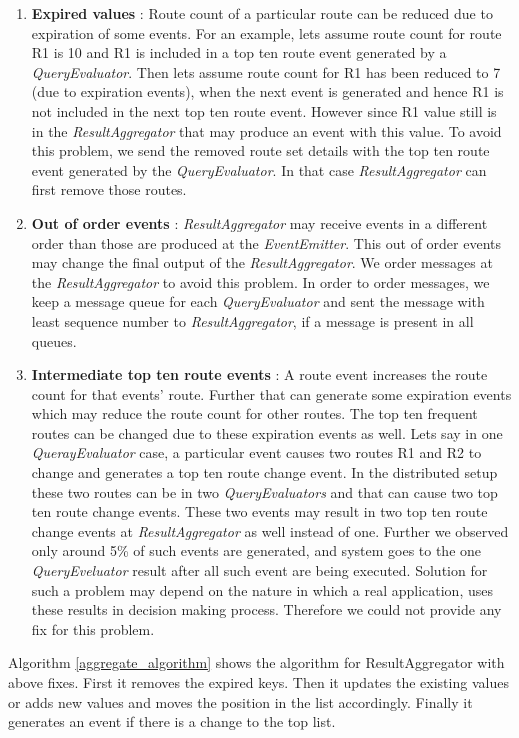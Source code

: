 \begin{enumerate}
	\item \textbf{Expired values} : Route count of a particular route can be reduced due to expiration of some events. For an example, lets assume route count for route R1 is 10 and R1 is included in a top ten route event generated by a \textit{QueryEvaluator}. Then lets assume route count for R1 has been reduced to 7 (due to expiration events), when the next event is generated and hence R1 is not included in the next top ten route event. However since R1 value still is in the \textit{ResultAggregator} that may produce an event with this value. To avoid this problem, we send the removed route set details with the top ten route event generated by the \textit{QueryEvaluator}. In that case \textit{ResultAggregator} can first remove those routes.
	\item \textbf{Out of order events} : \textit{ResultAggregator} may receive events in a different order than those are produced at the \textit{EventEmitter}. This out of order events may change the final output of the \textit{ResultAggregator}. We order messages at the \textit{ResultAggregator} to avoid this problem. In order to order messages, we keep a message queue for each \textit{QueryEvaluator} and sent the message with least sequence number to \textit{ResultAggregator},  if a message is present in all queues. 
	\item \textbf{Intermediate top ten route events} : A route event increases the route count for that events' route. Further that can generate some expiration events which may reduce the route count for other routes. The top ten frequent routes can be changed due to these expiration events as well. Lets say in one \textit{QuerayEvaluator} case, a particular event causes two routes R1 and R2 to change and generates a top ten route change event. In the distributed setup these two routes can be in two \textit{QueryEvaluators} and that can cause two top ten route change events. These two events may result in two top ten route change events at \textit{ResultAggregator} as well instead of one. Further we observed only around 5\% of such events are generated, and system goes to the one \textit{QueryEveluator} result after all such event are being executed. Solution for such a problem may depend on the nature in which a real application, uses these results in decision making process. Therefore we could not provide any fix for this problem.
\end{enumerate}

Algorithm \ref{aggregate_algorithm} shows the algorithm for ResultAggregator with above fixes. First it removes the expired keys. Then it updates the existing values or adds new values and moves the position in the list accordingly. Finally it generates an event if there is a change to the top list.



